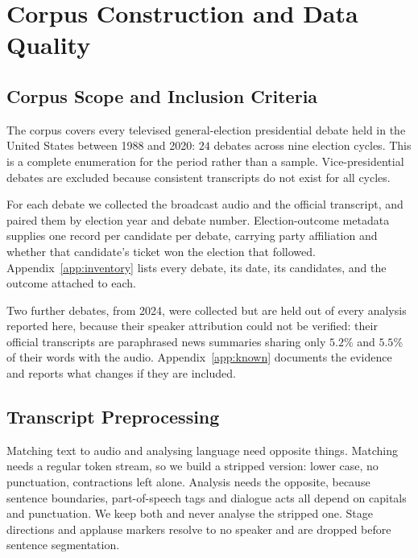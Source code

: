 \documentclass[journal]{IEEEtran}
\begin{document}
\section{Corpus Construction and Data Quality}
\label{sec:data}

\subsection{Corpus Scope and Inclusion Criteria}
\label{sec:data:collect}

The corpus covers every televised general-election presidential debate held in
the United States between 1988 and 2020: $24$ debates across nine election
cycles. This is a complete enumeration for the period rather than a sample.
Vice-presidential debates are excluded because consistent transcripts do not
exist for all cycles.

For each debate we collected the broadcast audio and the official transcript,
and paired them by election year and debate number. Election-outcome metadata
supplies one record per candidate per debate, carrying party affiliation and
whether that candidate's ticket won the election that followed.
Appendix~\ref{app:inventory} lists every debate, its date, its candidates, and
the outcome attached to each.

Two further debates, from 2024, were collected but are held out of every
analysis reported here, because their speaker attribution could not be
verified: their official transcripts are paraphrased news summaries sharing
only $5.2\%$ and $5.5\%$ of their words with the audio. Appendix~\ref{app:known}
documents the evidence and reports what changes if they are included.

\subsection{Transcript Preprocessing}
\label{sec:data:prep}

Matching text to audio and analysing language need opposite things. Matching
needs a regular token stream, so we build a stripped version: lower case, no
punctuation, contractions left alone. Analysis needs the opposite, because
sentence boundaries, part-of-speech tags and dialogue acts all depend on
capitals and punctuation. We keep both and never analyse the stripped one.
Stage directions and applause markers resolve to no speaker and are dropped
before sentence segmentation.
\end{document}
